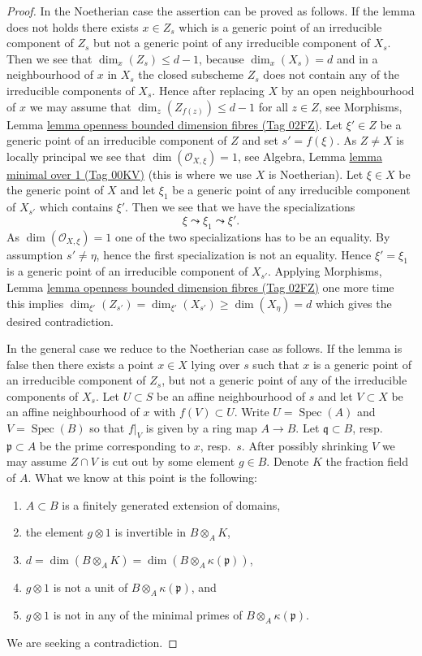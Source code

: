 \documentclass{amsart}
\theoremstyle{plain}
\theoremstyle{definition}
\theoremstyle{remark}
\numberwithin{equation}{subsection}
\def\Spec{\mathop{\mathrm{Spec}}}
\begin{document}
\begin{proof}
\medskip\noindent
In the Noetherian case the assertion can be proved as follows.
If the lemma does not holds there exists $x \in Z_s$ which is a generic
point of an irreducible component of $Z_s$ but not a generic point
of any irreducible component of $X_s$. Then we see that
$\dim_x(Z_s) \leq d - 1$, because $\dim_x(X_s) = d$ and in a neighbourhood
of $x$ in $X_s$ the closed subscheme $Z_s$ does not contain any of the
irreducible components of $X_s$. Hence after replacing $X$ by an
open neighbourhood of $x$ we may assume that
$\dim_z(Z_{f(z)}) \leq d - 1$ for all $z \in Z$, see
Morphisms, Lemma \href{https://stacks.math.columbia.edu/tag/02FZ}{lemma openness bounded dimension fibres (Tag 02FZ)}.
Let $\xi' \in Z$ be a generic point of an irreducible component of $Z$
and set $s' = f(\xi)$. As $Z \not = X$ is locally principal we see that
$\dim(\mathcal{O}_{X, \xi}) = 1$, see
Algebra, Lemma \href{https://stacks.math.columbia.edu/tag/00KV}{lemma minimal over 1 (Tag 00KV)}
(this is where we use $X$ is Noetherian).
Let $\xi \in X$ be the generic point of $X$ and
let $\xi_1$ be a generic point of any irreducible component
of $X_{s'}$ which contains $\xi'$. Then we see that we have
the specializations
$$
\xi \leadsto \xi_1 \leadsto \xi'.
$$
As $\dim(\mathcal{O}_{X, \xi}) = 1$ one of the two specializations
has to be an equality.
By assumption $s' \not = \eta$, hence the first specialization
is not an equality.
Hence $\xi' = \xi_1$ is a generic point of an irreducible component of
$X_{s'}$. Applying
Morphisms, Lemma \href{https://stacks.math.columbia.edu/tag/02FZ}{lemma openness bounded dimension fibres (Tag 02FZ)}
one more time this implies
$\dim_{\xi'}(Z_{s'}) = \dim_{\xi'}(X_{s'}) \geq \dim(X_\eta) = d$
which gives the desired contradiction.

\medskip\noindent
In the general case we reduce to the Noetherian case as follows.
If the lemma is false then there exists a point
$x \in X$ lying over $s$ such that $x$ is a generic point of an
irreducible component of $Z_s$, but
not a generic point of any of the irreducible components of $X_s$.
Let $U \subset S$ be an affine neighbourhood of $s$ and let
$V \subset X$ be an affine neighbourhood of $x$ with $f(V) \subset U$.
Write $U = \Spec(A)$ and $V = \Spec(B)$ so that $f|_V$
is given by a ring map $A \to B$. Let $\mathfrak q \subset B$,
resp.\ $\mathfrak p \subset A$ be the prime corresponding to $x$, resp.\ $s$.
After possibly shrinking $V$ we may assume $Z \cap V$ is cut out by
some element $g \in B$. Denote $K$ the fraction field of $A$.
What we know at this point is the following:
\begin{enumerate}
\item $A \subset B$ is a finitely generated extension of domains,
\item the element $g \otimes 1$ is invertible in $B \otimes_A K$,
\item $d = \dim(B \otimes_A K) = \dim(B \otimes_A \kappa(\mathfrak p))$,
\item $g \otimes 1$ is not a unit of $B \otimes_A \kappa(\mathfrak p)$, and
\item $g \otimes 1$ is not in any of the minimal primes of
$B \otimes_A \kappa(\mathfrak p)$.
\end{enumerate}
We are seeking a contradiction.


\end{proof}
\end{document}
